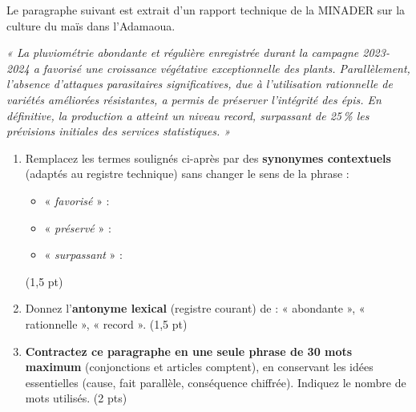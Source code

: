 \documentclass[11pt]{article}
\begin{document}
\begin{exercice}
Le paragraphe suivant est extrait d'un rapport technique de la MINADER sur la culture du maïs dans l'Adamaoua.

\textit{ « La pluviométrie abondante et régulière enregistrée durant la campagne 2023-2024 a favorisé une croissance végétative exceptionnelle des plants. Parallèlement, l'absence d'attaques parasitaires significatives, due à l'utilisation rationnelle de variétés améliorées résistantes, a permis de préserver l'intégrité des épis. En définitive, la production a atteint un niveau record, surpassant de 25\,\% les prévisions initiales des services statistiques. »}

\begin{enumerate}
    \item Remplacez les termes soulignés ci-après par des \textbf{synonymes contextuels} (adaptés au registre technique) sans changer le sens de la phrase :
    \begin{itemize}
        \item « \textit{favorisé} » : \dotfill
        \item « \textit{préservé} » : \dotfill
        \item « \textit{surpassant} » : \dotfill
    \end{itemize} (1,5 pt)
    \item Donnez l'\textbf{antonyme lexical} (registre courant) de : « abondante », « rationnelle », « record ». (1,5 pt)
    \item \textbf{Contractez ce paragraphe en une seule phrase de 30 mots maximum} (conjonctions et articles comptent), en conservant les idées essentielles (cause, fait parallèle, conséquence chiffrée). Indiquez le nombre de mots utilisés. (2 pts)
\end{enumerate}
\end{exercice}
\end{document}
